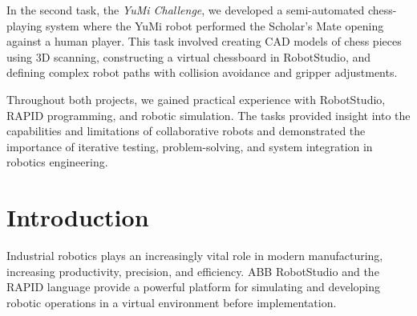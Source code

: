\documentclass[a4paper,12pt]{article}
\begin{document}
In the second task, the \textit{YuMi Challenge}, we developed a semi-automated chess-playing system where the YuMi robot performed the Scholar's Mate opening against a human player. This task involved creating CAD models of chess pieces using 3D scanning, constructing a virtual chessboard in RobotStudio, and defining complex robot paths with collision avoidance and gripper adjustments.

Throughout both projects, we gained practical experience with RobotStudio, RAPID programming, and robotic simulation. The tasks provided insight into the capabilities and limitations of collaborative robots and demonstrated the importance of iterative testing, problem-solving, and system integration in robotics engineering.


\newpage
\tableofcontents
\newpage

\section{Introduction}
Industrial robotics plays an increasingly vital role in modern manufacturing, increasing productivity, precision, and efficiency. ABB RobotStudio and the RAPID language provide a powerful platform for simulating and developing robotic operations in a virtual environment before implementation.
\end{document}
